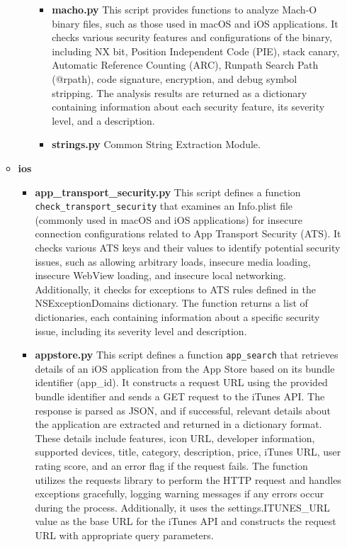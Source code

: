 \documentclass{report}
\begin{document}
\begin{itemize}
\begin{itemize}
\begin{itemize}
\begin{itemize}
                        \item \textbf{macho.py}
                        This script provides functions to analyze Mach-O binary files, such as those used in macOS and iOS applications. It checks various security features and configurations of the binary, including NX bit, Position Independent Code (PIE), stack canary, Automatic Reference Counting (ARC), Runpath Search Path (@rpath), code signature, encryption, and debug symbol stripping. The analysis results are returned as a dictionary containing information about each security feature, its severity level, and a description.
                        \item \textbf{strings.py}
                        Common String Extraction Module. 
                    \end{itemize}
                \end{itemize}
            \item \textbf {ios}
                \begin{itemize}
                    \item \textbf {app\_transport\_security.py}                    
                    This script defines a function \texttt{check\_transport\_security} that examines an Info.plist file (commonly used in macOS and iOS applications) for insecure connection configurations related to App Transport Security (ATS). It checks various ATS keys and their values to identify potential security issues, such as allowing arbitrary loads, insecure media loading, insecure WebView loading, and insecure local networking. Additionally, it checks for exceptions to ATS rules defined in the NSExceptionDomains dictionary. The function returns a list of dictionaries, each containing information about a specific security issue, including its severity level and description.
                    \item \textbf{appstore.py}
                    This script defines a function \texttt{app\_search} that retrieves details of an iOS application from the App Store based on its bundle identifier (app\_id). It constructs a request URL using the provided bundle identifier and sends a GET request to the iTunes API. The response is parsed as JSON, and if successful, relevant details about the application are extracted and returned in a dictionary format. These details include features, icon URL, developer information, supported devices, title, category, description, price, iTunes URL, user rating score, and an error flag if the request fails. The function utilizes the requests library to perform the HTTP request and handles exceptions gracefully, logging warning messages if any errors occur during the process. Additionally, it uses the settings.ITUNES\_URL value as the base URL for the iTunes API and constructs the request URL with appropriate query parameters.

\end{itemize}
\end{itemize}
\end{itemize}
\end{document}
